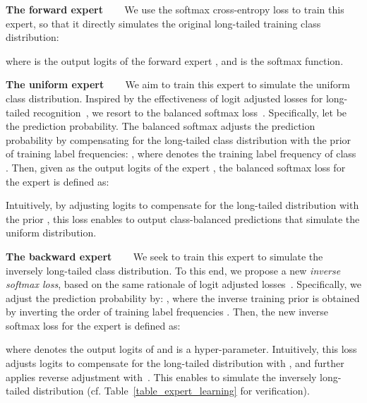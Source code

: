\documentclass{article}
\begin{document}
 
 



\textbf{The forward expert} ~~~ We  use the softmax cross-entropy loss to train this expert, so that it   directly simulates the original long-tailed training class distribution:

where  is the output logits of the forward expert , and  is the softmax function. 
 
  

  \textbf{The uniform expert} ~~~  We aim to train this expert to simulate the uniform class distribution. Inspired by the effectiveness of logit adjusted losses for long-tailed recognition~\cite{menon2020long}, we resort to the balanced softmax loss~\cite{jiawei2020balanced}. Specifically, let  be the  prediction probability. The  balanced softmax    adjusts the prediction probability    by compensating for the long-tailed  class distribution with  the prior of  training label frequencies: 
   , 
where  denotes the training label frequency of    class . Then, given  as  the output logits of the  expert ,   the balanced softmax loss for the  expert  is defined as:
 
Intuitively, by adjusting   logits to compensate for the long-tailed      distribution with the prior , this loss enables  to output class-balanced predictions that simulate the uniform  distribution. 
 
 

\textbf{The backward expert} ~~~  We seek to train this expert to simulate  the inversely long-tailed class distribution. To this end, we propose a new \emph{inverse softmax loss}, based on the same rationale of logit adjusted losses~\cite{jiawei2020balanced,menon2020long}. Specifically, we adjust the prediction probability  by: 
  ,   
where  the inverse training prior   is obtained by inverting the order of training label frequencies . Then, the new inverse softmax loss for the expert  is defined as:
 
where  denotes  the output logits of  and  is a hyper-parameter. Intuitively, this loss adjusts logits to compensate for the long-tailed     distribution with , and further applies  reverse adjustment  with~. This   enables  to   simulate the inversely long-tailed distribution   (cf. Table~\ref{table_expert_learning} for  verification). 
 



 
\end{document}
